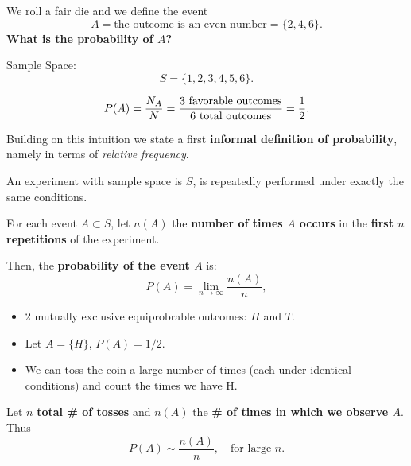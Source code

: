 \documentclass[notes=show]{beamer}\usepackage[]{graphicx}\usepackage[]{color}
\newcommand{\bea}{\begin{eqnarray}}
\newcommand{\eea}{\end{eqnarray}}
\begin{document}
\begin{frame}{\secname}

\begin{example}
We roll a fair die and we define the event $$A=\text{the outcome is an even number}=\{2,4,6\}.$$
\textbf{What is the probability of $A$?}
\vspace{0.5cm}

\pause
Sample Space:
$$S=\{1,2,3,4,5,6\}.$$

\pause
$$P(A)=\frac{N_A}{N} = \frac{\mbox{3 \text{favorable outcomes}}}{\mbox{6 total outcomes}} = \frac{1}{2}. %
$$


\end{example}


\end{frame}


\begin{frame}{\secname}

Building on this intuition we state a first \textbf{informal definition of probability}, namely in terms of \textit{relative frequency}.

\pause

\begin{definition}[Informal]
An experiment with sample space is $S$, is repeatedly performed under exactly the same conditions.

For each event $A\subset S$, let $n(A)$ the \textbf{number of times $A$ occurs} in the \textbf{first $n$ repetitions} of the experiment.

\pause

Then, the \textbf{probability of the event $A$} is:
$$
P(A)=\lim_{n \to \infty} \frac{n(A)}{n},
$$
\end{definition}
\end{frame}

\begin{frame}{\secname}
\begin{example}

\begin{itemize}
\item 2 mutually exclusive equiprobrable outcomes: $H$ and $T$.
\item Let $A = \{H\}$, $P(A)=1/2$.
\item We can toss the coin a large number of times (each under identical conditions) and count the times we have H.
\end{itemize}

Let $n$ \textbf{total \# of tosses} and $n(A)$ the \textbf{\# of times in which we observe $A$}.
Thus $$P(A) \sim \frac{n(A)}{n}, \quad \text{for large $n$}.$$
\end{example}
\end{frame}
\end{document}
